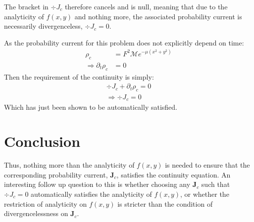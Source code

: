 \documentclass{article}
\begin{document}
The bracket in $\div{J}_c$ therefore cancels and is null, meaning that due to
the analyticity of $f(x,y)$ and nothing more, the associated probability current
is necessarily divergenceless, $\div{J}_c = 0$.

As the probability current for this problem does not explicitly depend on time:
\begin{align}
    \rho_c &= F^2 \mathcal{M} e^{-\mu \left(x^2 + y^2 \right)} \\
    \Rightarrow \partial_t \rho_c &= 0
\end{align}
Then the requirement of the continuity is simply:
\begin{align}
    \div{J}_c + \partial_t \rho_c = 0 \\
    \Rightarrow \div{J}_c = 0
\end{align}
Which has just been shown to be automatically satisfied.

\section{Conclusion}

Thus, nothing more than the analyticity of $f(x,y)$ is needed to ensure that the
corresponding probability current, $\mathbf{J}_c$, satisfies the continuity
equation. An interesting follow up question to this is whether choosing any
$\mathbf{J}_c$ such that $\div{J}_c = 0$ automatically satisfies the analyticity of
$f(x,y)$, or whether the restriction of analyticity on $f(x,y)$ is stricter than
the condition of divergencelessness on $\mathbf{J}_c$.
\end{document}
